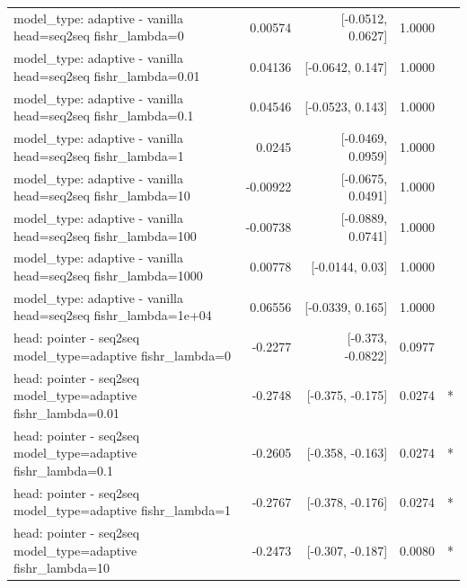 \documentclass[10pt]{article}
\makeatletter
\newcommand{\stackcell}[1]{\begin{tabular}[t]{@{}l@{}}#1\end{tabular}}
\makeatother
\begin{document}
{\begin{longtable}{lrrrl}
\stackcell{model\_type: adaptive - vanilla\\\footnotesize head=seq2seq fishr\_lambda=0 } & 0.00574 & [-0.0512, 0.0627] & 1.0000 & \\
\stackcell{model\_type: adaptive - vanilla\\\footnotesize head=seq2seq fishr\_lambda=0.01 } & 0.04136 & [-0.0642, 0.147] & 1.0000 & \\
\stackcell{model\_type: adaptive - vanilla\\\footnotesize head=seq2seq fishr\_lambda=0.1 } & 0.04546 & [-0.0523, 0.143] & 1.0000 & \\
\stackcell{model\_type: adaptive - vanilla\\\footnotesize head=seq2seq fishr\_lambda=1 } & 0.0245 & [-0.0469, 0.0959] & 1.0000 & \\
\stackcell{model\_type: adaptive - vanilla\\\footnotesize head=seq2seq fishr\_lambda=10 } & -0.00922 & [-0.0675, 0.0491] & 1.0000 & \\
\stackcell{model\_type: adaptive - vanilla\\\footnotesize head=seq2seq fishr\_lambda=100 } & -0.00738 & [-0.0889, 0.0741] & 1.0000 & \\
\stackcell{model\_type: adaptive - vanilla\\\footnotesize head=seq2seq fishr\_lambda=1000 } & 0.00778 & [-0.0144, 0.03] & 1.0000 & \\
\stackcell{model\_type: adaptive - vanilla\\\footnotesize head=seq2seq fishr\_lambda=1e+04 } & 0.06556 & [-0.0339, 0.165] & 1.0000 & \\
\stackcell{head: pointer - seq2seq\\\footnotesize model\_type=adaptive fishr\_lambda=0 } & -0.2277 & [-0.373, -0.0822] & 0.0977 & \\
\stackcell{head: pointer - seq2seq\\\footnotesize model\_type=adaptive fishr\_lambda=0.01 } & -0.2748 & [-0.375, -0.175] & 0.0274 & *\\
\stackcell{head: pointer - seq2seq\\\footnotesize model\_type=adaptive fishr\_lambda=0.1 } & -0.2605 & [-0.358, -0.163] & 0.0274 & *\\
\stackcell{head: pointer - seq2seq\\\footnotesize model\_type=adaptive fishr\_lambda=1 } & -0.2767 & [-0.378, -0.176] & 0.0274 & *\\
\stackcell{head: pointer - seq2seq\\\footnotesize model\_type=adaptive fishr\_lambda=10 } & -0.2473 & [-0.307, -0.187] & 0.0080 & *\\

\end{longtable}}
\end{document}
